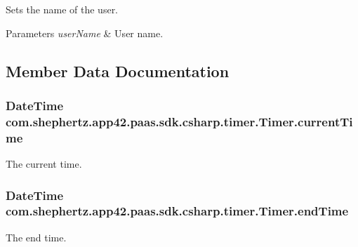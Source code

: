 Sets the name of the user. 


\begin{DoxyParams}{Parameters}
{\em user\+Name} & User name.\\
\hline
\end{DoxyParams}


\subsection{Member Data Documentation}
\hypertarget{classcom_1_1shephertz_1_1app42_1_1paas_1_1sdk_1_1csharp_1_1timer_1_1_timer_a2fc22d08c6ae6f30d4cfd6315077392d}{
\subsubsection[{current\+Time}]{\setlength{\rightskip}{0pt plus 5cm}Date\+Time com.\+shephertz.\+app42.\+paas.\+sdk.\+csharp.\+timer.\+Timer.\+current\+Time}}\label{classcom_1_1shephertz_1_1app42_1_1paas_1_1sdk_1_1csharp_1_1timer_1_1_timer_a2fc22d08c6ae6f30d4cfd6315077392d}


The current time. 

\hypertarget{classcom_1_1shephertz_1_1app42_1_1paas_1_1sdk_1_1csharp_1_1timer_1_1_timer_a4ab4fc1121493a5f2c467f7e4421fe5b}{
\subsubsection[{end\+Time}]{\setlength{\rightskip}{0pt plus 5cm}Date\+Time com.\+shephertz.\+app42.\+paas.\+sdk.\+csharp.\+timer.\+Timer.\+end\+Time}}\label{classcom_1_1shephertz_1_1app42_1_1paas_1_1sdk_1_1csharp_1_1timer_1_1_timer_a4ab4fc1121493a5f2c467f7e4421fe5b}


The end time. 

